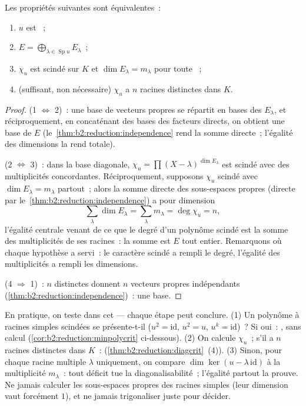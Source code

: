 \begin{theorem}\label{thm:b2:reduction:diagcrit}
Les propriétés suivantes sont équivalentes~:
\begin{enumerate}
  \item $u$ est ~;
  \item $E = \bigoplus_{\lambda \in \operatorname{Sp} u} E_\lambda$~;
  \item $\chi_u$ est scindé sur $K$ et $\dim E_\lambda = m_\lambda$
        pour toute ~;
  \item (suffisant, non nécessaire) $\chi_u$ a $n$ racines distinctes
        dans $K$.
\end{enumerate}
\end{theorem}

\begin{proof}
(1 $\iff$ 2)~: une base de vecteurs propres se répartit en bases des
$E_\lambda$, et réciproquement, en concaténant des bases des facteurs
directs, on obtient une base de $E$ (le~\cref{thm:b2:reduction:independence}
rend la somme directe~; l'égalité des dimensions la rend totale).

(2 $\iff$ 3)~: dans la base diagonale, $\chi_u = \prod (X -
\lambda)^{\dim E_\lambda}$ est scindé avec des multiplicités
concordantes. Réciproquement, supposons $\chi_u$ scindé avec $\dim
E_\lambda = m_\lambda$ partout~; alors la somme directe des
sous-espaces propres (directe par le~\cref{thm:b2:reduction:independence})
a pour dimension
\[
\sum_{\lambda}\dim E_\lambda = \sum_{\lambda} m_\lambda =
\deg\chi_u = n ,
\]
l'égalité centrale venant de ce que le degré d'un polynôme scindé est
la somme des multiplicités de ses racines~: la somme est $E$ tout
entier. Remarquons où chaque hypothèse a servi~: le caractère scindé
a rempli le degré, l'égalité des multiplicités a rempli les
dimensions.

(4 $\Rightarrow$ 1)~: $n$  distinctes donnent $n$
vecteurs propres indépendants (\cref{thm:b2:reduction:independence})~:
une base.
\end{proof}

\begin{method}\label{met:b2:reduction:decide}
En pratique, on teste dans cet  --- chaque étape peut conclure.
(1) Un polynôme  à racines simples scindées se
présente-t-il ($u^2 = \mathrm{id}$, $u^2 = u$, $u^k = \mathrm{id}$)~?
Si oui~: , sans calcul (\cref{cor:b2:reduction:minpolycrit}
ci-dessous). (2) On calcule $\chi_u$~; s'il a $n$ racines distinctes
dans $K$~:  (\cref{thm:b2:reduction:diagcrit}~(4)). (3)
Sinon, pour chaque racine multiple $\lambda$ uniquement, on compare
$\dim\ker(u - \lambda\,\mathrm{id})$ à la multiplicité $m_\lambda$~:
tout déficit tue la diagonalisabilité~; l'égalité partout la prouve.
Ne jamais calculer les sous-espaces propres des racines simples (leur
dimension vaut forcément $1$), et ne jamais trigonaliser juste pour
décider.
\end{method}

